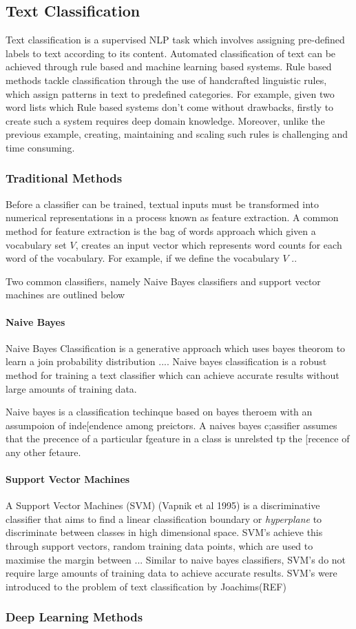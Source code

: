 \subsection{Text Classification}
Text classification is a supervised NLP task which involves assigning pre-defined labels to text according to its content. Automated classification of text can be achieved through rule based and machine learning based systems. Rule based methods tackle classification through the use of handcrafted linguistic rules, which assign patterns in text to predefined categories. For example, given two word lists which  Rule based systems don't come without drawbacks, firstly to create such a system requires deep domain knowledge. Moreover, unlike the previous example, creating, maintaining and scaling such rules is challenging and time consuming. 
\subsubsection{Traditional Methods}
Before a classifier can be trained, textual inputs must be transformed into numerical representations in a process known as feature extraction. A common method for feature extraction is the bag of words approach which given a vocabulary set \(V\), creates an input vector which represents word counts for each word of the vocabulary. For example, if we define the vocabulary \(V\) ..

Two common classifiers, namely Naive Bayes classifiers and support vector machines are outlined below

\paragraph{Naive Bayes}
\noindent
\newline 
Naive Bayes Classification is a generative approach which uses bayes theorom to learn a join probability distribution .... Naive bayes classification is a robust method for training a text classifier which can achieve accurate results without large amounts of training data.

Naive bayes is a classification techinque based on bayes theroem with an assumpoion of inde[endence among preictors. A naives bayes c;assifier assumes that the precence of a particular fgeature in a class is unrelsted tp the [recence of any other fetaure.

\paragraph{Support Vector Machines}
\noindent
\newline 
A Support Vector Machines (SVM) (Vapnik et al 1995) is a discriminative classifier that aims to find a linear classification boundary or \textit{hyperplane} to discriminate between classes in high dimensional space. SVM's achieve this through support vectors, random training data points, which are used to maximise the margin between ... Similar to naive bayes classifiers, SVM's do not require large amounts of training data to achieve accurate results. SVM's were introduced to the problem of text classification by Joachims(REF)

\subsubsection{Deep Learning Methods}
